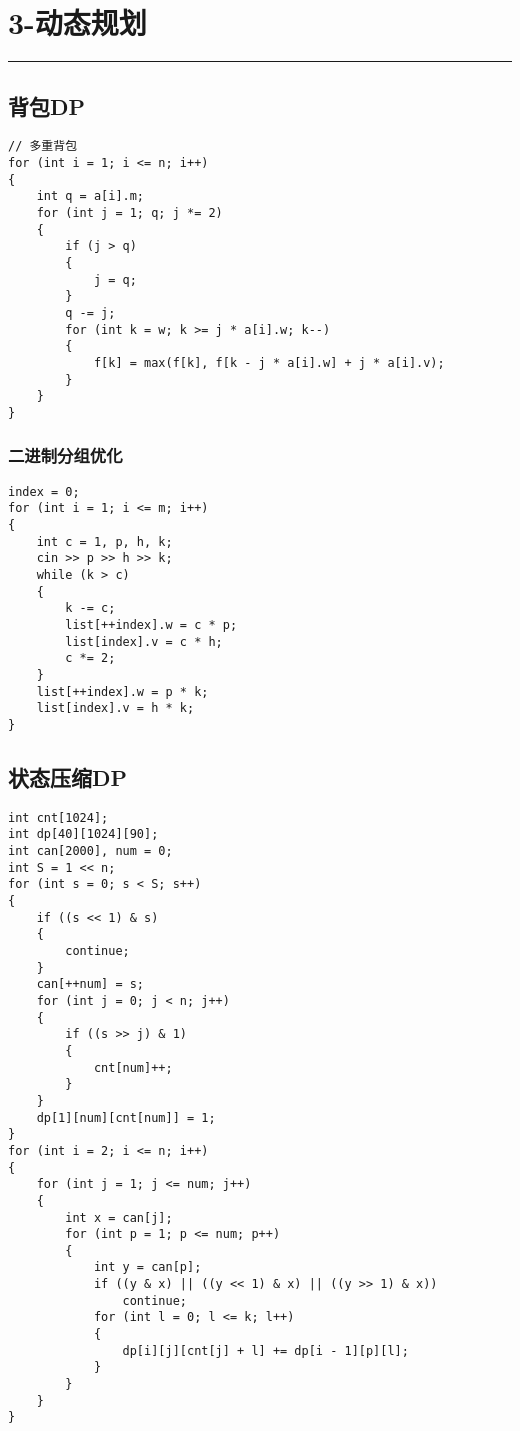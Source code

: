 \documentclass[]{article}
\begin{document}
\hypertarget{ux52a8ux6001ux89c4ux5212}{%
\section{3-动态规划}\label{ux52a8ux6001ux89c4ux5212}}

\begin{center}\rule{0.5\linewidth}{0.5pt}\end{center}

\hypertarget{ux80ccux5305dp}{%
\subsection{背包DP}\label{ux80ccux5305dp}}

\begin{verbatim}
// 多重背包
for (int i = 1; i <= n; i++)
{
    int q = a[i].m;
    for (int j = 1; q; j *= 2)
    {
        if (j > q)
        {
            j = q;
        }
        q -= j;
        for (int k = w; k >= j * a[i].w; k--)
        {
            f[k] = max(f[k], f[k - j * a[i].w] + j * a[i].v);
        }
    }
}
\end{verbatim}

\hypertarget{ux4e8cux8fdbux5236ux5206ux7ec4ux4f18ux5316}{%
\subsubsection{二进制分组优化}\label{ux4e8cux8fdbux5236ux5206ux7ec4ux4f18ux5316}}

\begin{verbatim}
index = 0;
for (int i = 1; i <= m; i++)
{
    int c = 1, p, h, k;
    cin >> p >> h >> k;
    while (k > c)
    {
        k -= c;
        list[++index].w = c * p;
        list[index].v = c * h;
        c *= 2;
    }
    list[++index].w = p * k;
    list[index].v = h * k;
}
\end{verbatim}

\hypertarget{ux72b6ux6001ux538bux7f29dp}{%
\subsection{状态压缩DP}\label{ux72b6ux6001ux538bux7f29dp}}

\begin{verbatim}
int cnt[1024];
int dp[40][1024][90];
int can[2000], num = 0;
int S = 1 << n;
for (int s = 0; s < S; s++)
{
    if ((s << 1) & s)
    {
        continue;
    }
    can[++num] = s;
    for (int j = 0; j < n; j++)
    {
        if ((s >> j) & 1)
        {
            cnt[num]++;
        }
    }
    dp[1][num][cnt[num]] = 1;
}
for (int i = 2; i <= n; i++)
{
    for (int j = 1; j <= num; j++)
    {
        int x = can[j];
        for (int p = 1; p <= num; p++)
        {
            int y = can[p];
            if ((y & x) || ((y << 1) & x) || ((y >> 1) & x))
                continue;
            for (int l = 0; l <= k; l++)
            {
                dp[i][j][cnt[j] + l] += dp[i - 1][p][l];
            }
        }
    }
}
\end{verbatim}
\end{document}
